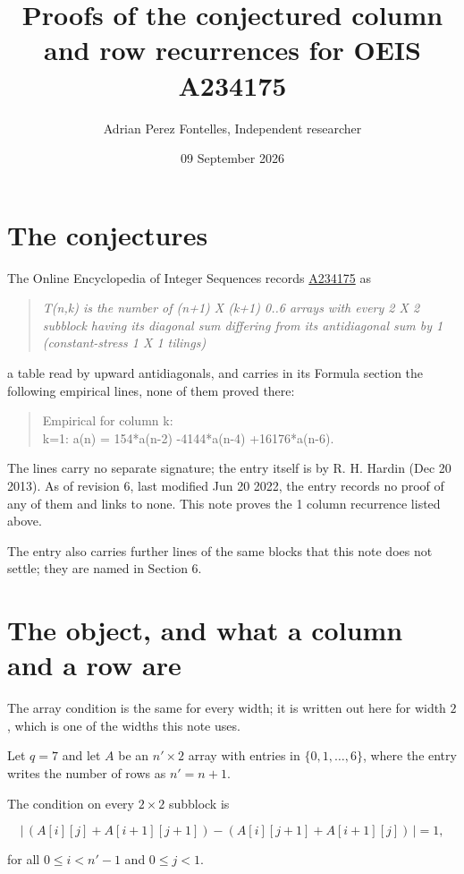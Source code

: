 \documentclass[11pt]{article}
\title{Proofs of the conjectured column and row recurrences for OEIS A234175}
\author{Adrian Perez Fontelles, Independent researcher}
\date{09 September 2026}
\theoremstyle{definition}
\begin{document}
\maketitle
\section{The conjectures}

The Online Encyclopedia of Integer Sequences records \href{https://oeis.org/A234175}{A234175} as

\begin{quote}\itshape T(n,k) is the number of (n+1) X (k+1) 0..6 arrays with every 2 X 2 subblock having its diagonal sum differing from its antidiagonal sum by 1 (constant-stress 1 X 1 tilings)\end{quote}

a table read by upward antidiagonals, and carries in its Formula section the following empirical lines, none of them proved there:

\begin{quote}\ttfamily Empirical for column k:\\
k=1: a(n) = 154*a(n-2) -4144*a(n-4) +16176*a(n-6).\end{quote}

The lines carry no separate signature; the entry itself is by R. H. Hardin (Dec 20 2013). As of revision 6, last modified Jun 20 2022, the entry records no proof of any of them and links to none. This note proves the 1 column recurrence listed above.

The entry also carries further lines of the same blocks that this note does not settle; they are named in Section 6.

\section{The object, and what a column and a row are}

The array condition is the same for every width; it is written out here for width $2$, which is one of the widths this note uses.

Let $q = 7$ and let $A$ be an $n' \times 2$ array with entries in $\{0,1,\dots,6\}$, where the entry writes the number of rows as $n' = n + 1$.

The condition on every $2 \times 2$ subblock is

\[\bigl|\,(A[i][j] + A[i{+}1][j{+}1]) - (A[i][j{+}1] + A[i{+}1][j])\,\bigr| = 1,\]

for all $0 \le i < n'-1$ and $0 \le j < 1$.
\end{document}
